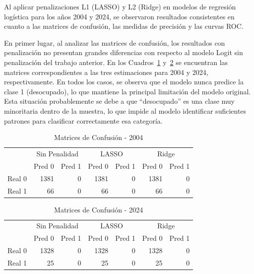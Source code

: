 \documentclass[12pt]{article}
\begin{document}
Al aplicar penalizaciones L1 (LASSO) y L2 (Ridge) en modelos de regresión logística para los años 2004 y 2024, se observaron resultados consistentes en cuanto a las matrices de confusión, las medidas de precisión y las curvas ROC.

En primer lugar, al analizar las matrices de confusión, los resultados con penalización no presentan grandes diferencias con respecto al modelo Logit sin penalización del trabajo anterior. En los Cuadros~\ref{tab:cm2004} y~\ref{tab:cm2024} se encuentran las matrices correspondientes a las tres estimaciones para 2004 y 2024, respectivamente. En todos los casos, se observa que el modelo nunca predice la clase 1 (desocupado), lo que mantiene la principal limitación del modelo original. Esta situación probablemente se debe a que ``desocupado'' es una clase muy minoritaria dentro de la muestra, lo que impide al modelo identificar suficientes patrones para clasificar correctamente esa categoría.

\begin{table}[H]
\begin{center}
\caption{Matrices de Confusión - 2004}
\label{tab:cm2004}
\begin{tabular}{l|rr|rr|rr}
\toprule
 & \multicolumn{2}{c|}{Sin Penalidad} & \multicolumn{2}{c|}{LASSO} & \multicolumn{2}{c}{Ridge} \\
 & Pred 0 & Pred 1 & Pred 0 & Pred 1 & Pred 0 & Pred 1 \\
\midrule
Real 0 & 1381 & 0 & 1381 & 0 & 1381 & 0 \\
Real 1 & 66 & 0 & 66 & 0 & 66 & 0 \\
\bottomrule
\end{tabular}
\end{center}
\end{table}

\begin{table}[H]
\begin{center}
\caption{Matrices de Confusión - 2024}
\label{tab:cm2024}
\begin{tabular}{l|rr|rr|rr}
\toprule
 & \multicolumn{2}{c|}{Sin Penalidad} & \multicolumn{2}{c|}{LASSO} & \multicolumn{2}{c}{Ridge} \\
 & Pred 0 & Pred 1 & Pred 0 & Pred 1 & Pred 0 & Pred 1 \\
\midrule
Real 0 & 1328 & 0 & 1328 & 0 & 1328 & 0 \\
Real 1 & 25 & 0 & 25 & 0 & 25 & 0 \\
\bottomrule
\end{tabular}
\end{center}
\end{table}
\end{document}
